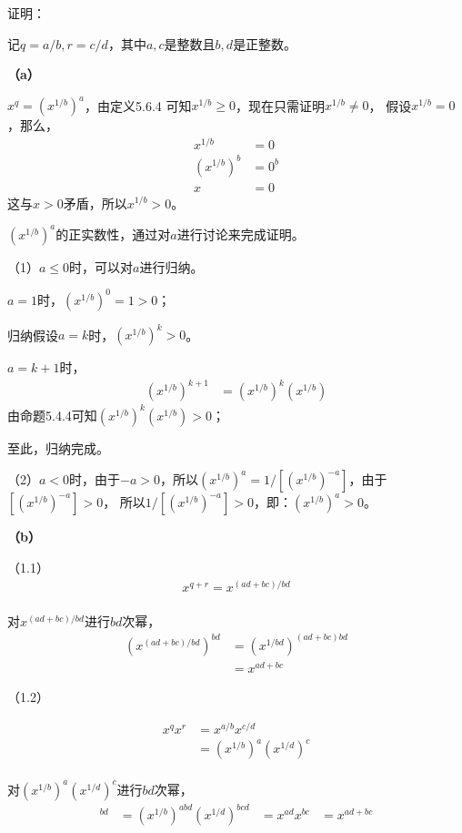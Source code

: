 \documentclass{article}
\theoremstyle{mystyle}
\begin{document}
证明：

记$q=a/b,r=c/d$，其中$a,c$是整数且$b,d$是正整数。

\textbf{（a）}

$x^q = (x^{1/b})^a$，由定义5.6.4 可知$x^{1/b} \geq 0$，现在只需证明$x^{1/b} \neq 0$，
假设$x^{1/b}=0$，那么，
\begin{align*}
  x^{1/b}     & = 0   \\
  (x^{1/b})^b & = 0^b \\
  x           & = 0
\end{align*}
这与$x>0$矛盾，所以$x^{1/b} > 0$。

$(x^{1/b})^a$的正实数性，通过对$a$进行讨论来完成证明。

（1）$a \leq 0$时，可以对$a$进行归纳。

$a=1$时，$(x^{1/b})^0=1 > 0$；

归纳假设$a=k$时，$(x^{1/b})^k > 0$。

$a=k+1$时，
\begin{align*}
  (x^{1/b})^{k+1} & = (x^{1/b})^k(x^{1/b})
\end{align*}
由命题5.4.4可知$(x^{1/b})^k(x^{1/b}) > 0$；

至此，归纳完成。

（2）$a < 0$时，由于$-a > 0$，所以$(x^{1/b})^a=1/[(x^{1/b})^{-a}]$，由于$[(x^{1/b})^{-a}]>0$，
所以$1/[(x^{1/b})^{-a}]>0$，即：$(x^{1/b})^a > 0$。

\textbf{（b）}

（1.1）
\begin{align*}
  x^{q+r} = x^{(ad+bc)/bd} \\
\end{align*}

对$x^{(ad+bc)/bd}$进行$bd$次幂，
\begin{align*}
  (x^{(ad+bc)/bd})^{bd} & =(x^{1/bd})^{(ad+bc)bd} \\
                        & = x^{ad+bc}
\end{align*}

（1.2）

\begin{align*}
  x^qx^r & = x^{a/b}x^{c/d}          \\
         & = (x^{1/b})^a (x^{1/d})^c \\
\end{align*}

对$(x^{1/b})^a (x^{1/d})^c$进行$bd$次幂，
\begin{align*}
  [(x^{1/b})^a (x^{1/d})^c]^{bd}
   & = (x^{1/b})^{abd}(x^{1/d})^{bcd}
   & = x^{ad}x^{bc}
   & = x^{ad+bc}
\end{align*}
\end{document}
